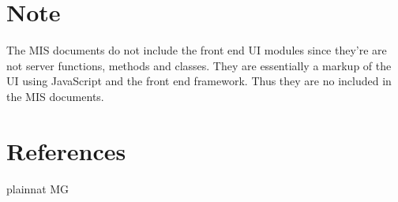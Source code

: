 \documentclass[12pt, titlepage]{article}
\begin{document}
\section*{Note}
The MIS documents do not include the front end UI modules since they're are not
server functions, methods and classes. They are essentially a markup of the UI
using JavaScript and the front end framework. Thus they are no included in the
MIS documents.

\section*{References}

 {plainnat}
 {MG}
\end{document}
